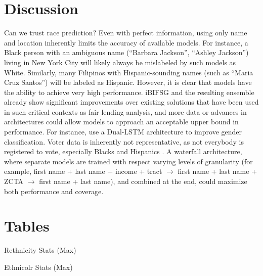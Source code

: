 \documentclass[12pt]{article}
\begin{document}
\section{Discussion}

Can we trust race prediction? Even with perfect information, using only name and location inherently limits the accuracy of available models. For instance, a Black person with an ambiguous name (``Barbara Jackson'', ``Ashley Jackson'') living in New York City will likely always be mislabeled by such models as White. Similarly, many Filipinos with Hispanic-sounding names (such as ``Maria Cruz Santos'') will be labeled as Hispanic. However, it is clear that models have the ability to achieve very high performance. iBIFSG and the resulting ensemble already show significant improvements over existing solutions that have been used in such critical contexts as fair lending analysis, and more data or advances in architectures could allow models to approach an acceptable upper bound in performance. For instance, \cite{hu2021} use a Dual-LSTM architecture to improve gender classification. Voter data is inherently not representative, as not everybody is registered to vote, especially Blacks and Hispanics \cite{sood2018}. A waterfall architecture, where separate models are trained with respect varying levels of granularity (for example, first name + last name + income + tract \( \rightarrow \) first name + last name + ZCTA \( \rightarrow \) first name + last name), and combined at the end, could maximize both performance and coverage.


\singlespacing
\setlength\bibsep{0pt}




\clearpage

\onehalfspacing
\section*{Tables} \label{sec:tab}

\begin{table}[H]
    \caption{Rethnicity Stats (Max)}
    \label{t:reth_stats_max}
    \centering
    
\end{table}

\begin{table}[H]
    \caption{Ethnicolr Stats (Max)}
    \label{t:eth_stats_max}
    \centering
    
\end{table}



\clearpage






\clearpage

\end{document}
